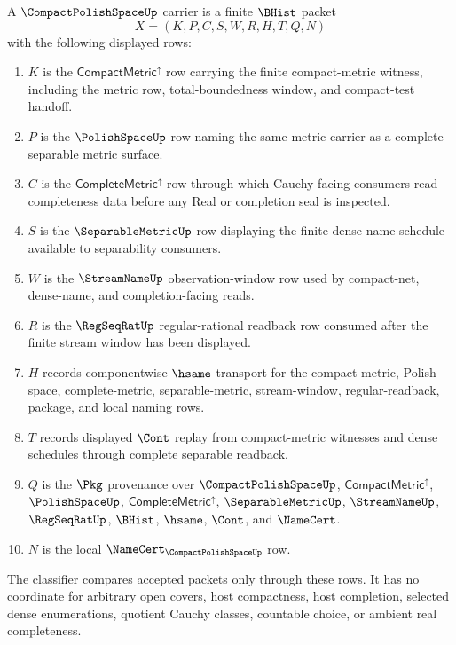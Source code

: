 \begin{definition}
\label{def:compact-polish-space-carrier}
A $\CompactPolishSpaceUp$ carrier is a finite $\BHist$ packet
$$
X=(K,P,C,S,W,R,H,T,Q,N)
$$
with the following displayed rows:
\begin{enumerate}
\item $K$ is the $\mathsf{CompactMetric}^{\uparrow}$ row carrying the finite compact-metric witness, including the metric row, total-boundedness window, and compact-test handoff.
\item $P$ is the $\PolishSpaceUp$ row naming the same metric carrier as a complete separable metric surface.
\item $C$ is the $\mathsf{CompleteMetric}^{\uparrow}$ row through which Cauchy-facing consumers read completeness data before any Real or completion seal is inspected.
\item $S$ is the $\SeparableMetricUp$ row displaying the finite dense-name schedule available to separability consumers.
\item $W$ is the $\StreamNameUp$ observation-window row used by compact-net, dense-name, and completion-facing reads.
\item $R$ is the $\RegSeqRatUp$ regular-rational readback row consumed after the finite stream window has been displayed.
\item $H$ records componentwise $\hsame$ transport for the compact-metric, Polish-space, complete-metric, separable-metric, stream-window, regular-readback, package, and local naming rows.
\item $T$ records displayed $\Cont$ replay from compact-metric witnesses and dense schedules through complete separable readback.
\item $Q$ is the $\Pkg$ provenance over $\CompactPolishSpaceUp$, $\mathsf{CompactMetric}^{\uparrow}$, $\PolishSpaceUp$, $\mathsf{CompleteMetric}^{\uparrow}$, $\SeparableMetricUp$, $\StreamNameUp$, $\RegSeqRatUp$, $\BHist$, $\hsame$, $\Cont$, and $\NameCert$.
\item $N$ is the local $\NameCert_{\CompactPolishSpaceUp}$ row.
\end{enumerate}
The classifier compares accepted packets only through these rows. It has no coordinate for arbitrary open covers, host compactness, host completion, selected dense enumerations, quotient Cauchy classes, countable choice, or ambient real completeness.
\end{definition}

